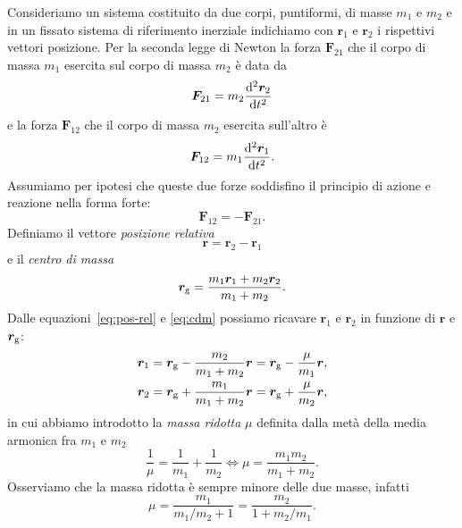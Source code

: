 Consideriamo un sistema costituito da due corpi, puntiformi, di masse $m_1$ e
$m_2$ e in un fissato sistema di riferimento inerziale indichiamo con $\bm{r}_1$
e $\bm{r}_2$ i rispettivi vettori posizione. %
Per la seconda legge di Newton la forza $\bm{F}_{21}$ che il corpo di massa
$m_1$ esercita sul corpo di massa $m_2$ è data da
\begin{equation}
  \label{eq:f21}
  \bm{F}_{21} = m_2\toder[2]{\bm{r}_2}{t}
\end{equation}
e la forza $\bm{F}_{12}$ che il corpo di massa $m_2$ esercita sull'altro è
\begin{equation}
  \label{eq:f12}
  \bm{F}_{12} = m_1\toder[2]{\bm{r}_1}{t}.
\end{equation}
Assumiamo per ipotesi che queste due forze soddisfino il principio di azione e
reazione nella forma forte:
\begin{equation}
  \label{eq:az-reaz}
  \bm{F}_{12} = -\bm{F}_{21}.
\end{equation}
Definiamo il vettore \emph{posizione relativa}
\begin{equation}
  \label{eq:pos-rel}
  \bm{r}=\bm{r}_2-\bm{r}_1
\end{equation}
e il \emph{centro di massa}
\begin{equation}
  \label{eq:cdm}
  \bm{r}_\textup{g} = \frac{m_1\bm{r}_1+m_2\bm{r}_2}{m_1+m_2}.
\end{equation}
Dalle equazioni~\eqref{eq:pos-rel} e \eqref{eq:cdm} possiamo ricavare $\bm{r}_1$
e $\bm{r}_2$ in funzione di $\bm{r}$ e $\bm{r}_\textup{g}$:
\begin{subequations}
  \begin{align}
    \bm{r}_1 &= \bm{r}_\textup{g} - \frac{m_2}{m_1+m_2}\bm{r} =
    \bm{r}_\textup{g} - \frac{\mu}{m_1}\bm{r},\\
    \bm{r}_2 &= \bm{r}_\textup{g} + \frac{m_1}{m_1+m_2}\bm{r} =
    \bm{r}_\textup{g} + \frac{\mu}{m_2}\bm{r},
  \end{align}
\end{subequations}
in cui abbiamo introdotto la \emph{massa ridotta} $\mu$ definita dalla metà
della media armonica fra $m_1$ e $m_2$
\begin{equation}
  \frac{1}{\mu} = \frac{1}{m_1} + \frac{1}{m_2} \iff \mu=\frac{m_1m_2}{m_1+m_2}.
\end{equation}
Osserviamo che la massa ridotta è sempre minore delle due masse, infatti
\begin{equation}
  \mu =\frac{m_1}{m_1/m_2+1} = \frac{m_2}{1+m_2/m_1}.
\end{equation}
